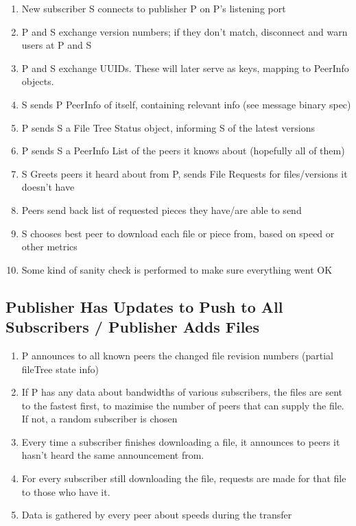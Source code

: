 \documentclass[12pt,a4paper,]{adreport}
\begin{document}
\begin{enumerate}
\def\labelenumi{\arabic{enumi}.}
\itemsep1pt\parskip0pt
\item
  New subscriber S connects to publisher P on P's listening port
\item
  P and S exchange version numbers; if they don't match, disconnect and
  warn users at P and S
\item
  P and S exchange UUIDs. These will later serve as keys, mapping to
  PeerInfo objects.
\item
  S sends P PeerInfo of itself, containing relevant info (see message
  binary spec)
\item
  P sends S a File Tree Status object, informing S of the latest
  versions
\item
  P sends S a PeerInfo List of the peers it knows about (hopefully all
  of them)
\item
  S Greets peers it heard about from P, sends File Requests for
  files/versions it doesn't have
\item
  Peers send back list of requested pieces they have/are able to send
\item
  S chooses best peer to download each file or piece from, based on
  speed or other metrics
\item
  Some kind of sanity check is performed to make sure everything went OK
\end{enumerate}

\subsection{Publisher Has Updates to Push to All Subscribers / Publisher
Adds
Files}\label{publisher-has-updates-to-push-to-all-subscribers-publisher-adds-files}

\begin{enumerate}
\def\labelenumi{\arabic{enumi}.}
\itemsep1pt\parskip0pt
\item
  P announces to all known peers the changed file revision numbers
  (partial fileTree state info)
\item
  If P has any data about bandwidths of various subscribers, the files
  are sent to the fastest first, to mazimise the number of peers that
  can supply the file. If not, a random subscriber is chosen
\item
  Every time a subscriber finishes downloading a file, it announces to
  peers it hasn't heard the same announcement from.
\item
  For every subscriber still downloading the file, requests are made for
  that file to those who have it.
\item
  Data is gathered by every peer about speeds during the transfer
\end{enumerate}
\end{document}
